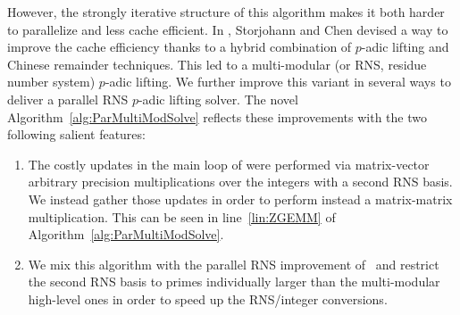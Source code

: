 However, the strongly iterative structure of this algorithm makes it both harder to parallelize and less cache
efficient.
In \cite{ChSt05}, Storjohann and Chen devised a way to improve the cache efficiency thanks to a hybrid combination of
$p$-adic lifting and Chinese remainder techniques.
This led to a multi-modular (or RNS, residue number system) $p$-adic
lifting.
We further improve this variant in several ways to deliver a parallel
RNS $p$-adic lifting solver. The novel
Algorithm~\ref{alg:ParMultiModSolve} reflects these improvements with
the two following salient features:
\begin{enumerate}
\item The costly updates in the main loop of \cite{ChSt05} were
  performed via matrix-vector arbitrary precision multiplications over
  the integers with a second RNS basis.
  We instead gather those updates in order to perform instead a
  matrix-matrix multiplication.
  This can be seen in line~\ref{lin:ZGEMM} of
  Algorithm~\ref{alg:ParMultiModSolve}.
\item We mix this algorithm with the parallel RNS improvement
  of~\cite{DGLS18} and restrict the second RNS basis to primes
  individually larger than the
  multi-modular high-level ones in order to speed up the RNS/integer
  conversions.
\end{enumerate}


